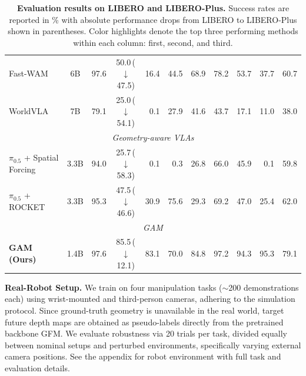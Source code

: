 \documentclass{llmxive}
\providecommand{\drop}[1]{{\scriptsize\,($\downarrow$#1)}}
\begin{document}
\begin{table}[t]
{\begin{tabular}{@{}l|c|cc|rrrrrrr}
Fast-WAM~\citep{yuan2026fast} & 6B
& \cellcolor{ranktwo}97.6 & 50.0\drop{47.5}
& 16.4 & 44.5 & 68.9 & 78.2 & 53.7 & 37.7 & 60.7 \\

WorldVLA~\cite{worldvla} & 7B
& 79.1 & 25.0\drop{54.1}
& 0.1 & 27.9 & 41.6 & 43.7 & 17.1 & 11.0 & 38.0 \\



\midrule
\multicolumn{11}{c}{\textit{Geometry-aware VLAs}} \\
\midrule
$\pi_{0.5}$ + Spatial Forcing~\cite{li2025spatial} & 3.3B
& 94.0 & 25.7\drop{58.3}
& 0.1 & 0.3 & 26.8 & 66.0 & 45.9 & 0.1 & 59.8 \\

$\pi_{0.5}$ + ROCKET~\cite{sun2026rocket} & 3.3B
& 95.3 & 47.5\drop{46.6}
& 30.9
& 75.6
& 29.3 & 69.2 & 47.0 & 25.4 & 62.0 \\

\midrule
\multicolumn{11}{c}{\textit{GAM}} \\
\midrule
\textbf{GAM (Ours)} & 1.4B
& \cellcolor{ranktwo}97.6
& \cellcolor{rankone}85.5\drop{12.1}
& \cellcolor{rankone}83.1
& \cellcolor{ranktwo}70.0
& \cellcolor{rankthree}84.8
& \cellcolor{ranktwo}97.2
& \cellcolor{ranktwo}94.3
& \cellcolor{rankone}95.3
& \cellcolor{rankthree}79.1 \\
\bottomrule
\end{tabular}%
}

\vspace{-10pt}
\caption{\textbf{Evaluation results on LIBERO and LIBERO-Plus.} Success rates are reported in \% with absolute performance drops from LIBERO to LIBERO-Plus shown in parentheses. Color highlights denote the top three performing methods within each column: \colorbox{rankone}{first}, \colorbox{ranktwo}{second}, and \colorbox{rankthree}{third}.}
\label{tab:sim}
\end{table}


\noindent\textbf{Real-Robot Setup.}
We train on four manipulation tasks ($\sim$200 demonstrations each) using wrist-mounted and third-person cameras, adhering to the simulation protocol. Since ground-truth geometry is unavailable in the real world, target future depth maps are obtained as pseudo-labels directly from the pretrained backbone GFM. We evaluate robustness via 20 trials per task, divided equally between nominal setups and perturbed environments, specifically varying external camera positions. See the appendix for robot environment with full task and evaluation details.
\end{document}
